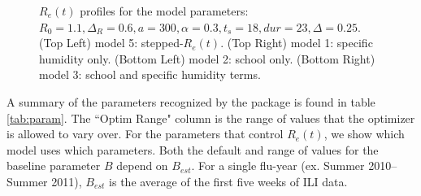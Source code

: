 \documentclass[a4paper]{article}
\begin{document}
\begin{figure}[htpb]
  \caption{$R_e(t)$ profiles for the model parameters: $R_{0}=1.1,\Delta_R=0.6,a=300,\alpha=0.3,t_s=18,dur=23,\Delta=0.25$. (Top Left) model 5: stepped-$R_e(t)$. (Top Right) model 1: specific humidity only.  (Bottom Left) model 2: school only. (Bottom Right) model 3: school and specific humidity terms.}
  \label{fig:Roft}
\end{figure}

A summary of the parameters recognized by the  package is found in table \ref{tab:param}.  The ``Optim Range" column is the range of values that the optimizer is allowed to vary over.  For the parameters that control $R_e(t)$, we show which model uses which parameters.  Both the default and range of values for the baseline parameter $B$ depend on $B_{est}$.  For a single flu-year (ex. Summer 2010--Summer 2011), $B_{est}$ is the average of the first five weeks of ILI data.
\end{document}
